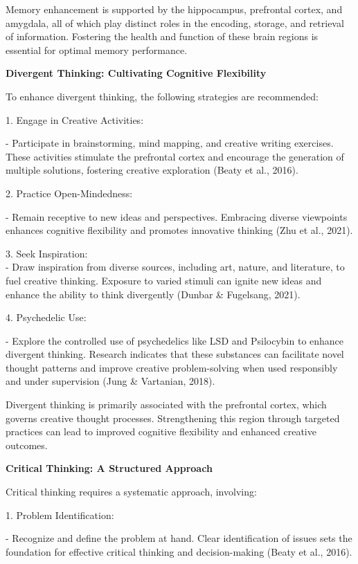 \documentclass[
]{article}
\begin{document}
Memory enhancement is supported by the hippocampus, prefrontal cortex,
and amygdala, all of which play distinct roles in the encoding, storage,
and retrieval of information. Fostering the health and function of these
brain regions is essential for optimal memory performance.

\textbf{Divergent Thinking: Cultivating Cognitive Flexibility}

To enhance divergent thinking, the following strategies are recommended:

1. Engage in Creative Activities:

- Participate in brainstorming, mind mapping, and creative writing
exercises. These activities stimulate the prefrontal cortex and
encourage the generation of multiple solutions, fostering creative
exploration (Beaty et al., 2016).

2. Practice Open-Mindedness:

- Remain receptive to new ideas and perspectives. Embracing diverse
viewpoints enhances cognitive flexibility and promotes innovative
thinking (Zhu et al., 2021).

3. Seek Inspiration:\\
- Draw inspiration from diverse sources, including art, nature, and
literature, to fuel creative thinking. Exposure to varied stimuli can
ignite new ideas and enhance the ability to think divergently (Dunbar \&
Fugelsang, 2021).

4. Psychedelic Use:

- Explore the controlled use of psychedelics like LSD and Psilocybin to
enhance divergent thinking. Research indicates that these substances can
facilitate novel thought patterns and improve creative problem-solving
when used responsibly and under supervision (Jung \& Vartanian, 2018).

Divergent thinking is primarily associated with the prefrontal cortex,
which governs creative thought processes. Strengthening this region
through targeted practices can lead to improved cognitive flexibility
and enhanced creative outcomes.

\textbf{Critical Thinking: A Structured Approach}

Critical thinking requires a systematic approach, involving:

1. Problem Identification:

- Recognize and define the problem at hand. Clear identification of
issues sets the foundation for effective critical thinking and
decision-making (Beaty et al., 2016).
\end{document}
